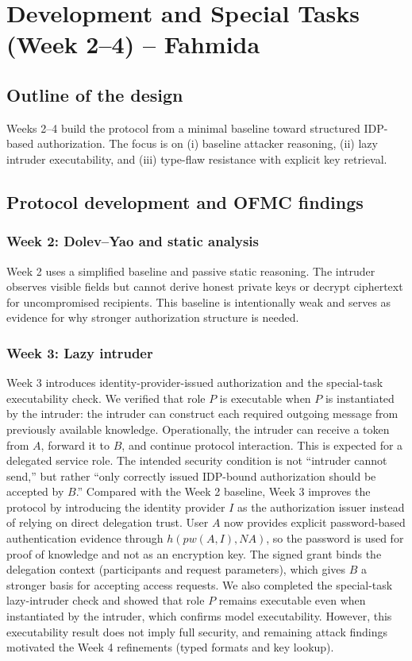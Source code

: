 \documentclass[11pt,a4paper]{article}
\begin{document}
\section{Development and Special Tasks (Week 2--4) -- Fahmida}
\subsection{Outline of the design}
Weeks 2--4 build the protocol from a minimal baseline toward structured IDP-based authorization.
The focus is on (i) baseline attacker reasoning, (ii) lazy intruder executability, and (iii) type-flaw resistance with explicit key retrieval.

\subsection{Protocol development and OFMC findings}
\subsubsection{Week 2: Dolev--Yao and static analysis}
Week 2 uses a simplified baseline and passive static reasoning.
The intruder observes visible fields but cannot derive honest private keys or decrypt ciphertext for uncompromised recipients.
This baseline is intentionally weak and serves as evidence for why stronger authorization structure is needed.

\subsubsection{Week 3: Lazy intruder}
Week 3 introduces identity-provider-issued authorization and the special-task executability check.
We verified that role $P$ is executable when $P$ is instantiated by the intruder:
the intruder can construct each required outgoing message from previously available knowledge.
Operationally, the intruder can receive a token from $A$, forward it to $B$, and continue protocol interaction.
This is expected for a delegated service role.
The intended security condition is not ``intruder cannot send,'' but rather ``only correctly issued IDP-bound authorization should be accepted by $B$.''
Compared with the Week 2 baseline, Week 3 improves the protocol by introducing the identity provider $I$ as the authorization issuer instead of relying on direct delegation trust.
User $A$ now provides explicit password-based authentication evidence through $h(pw(A,I),NA)$, so the password is used for proof of knowledge and not as an encryption key.
The signed grant binds the delegation context (participants and request parameters), which gives $B$ a stronger basis for accepting access requests.
We also completed the special-task lazy-intruder check and showed that role $P$ remains executable even when instantiated by the intruder, which confirms model executability.
However, this executability result does not imply full security, and remaining attack findings motivated the Week 4 refinements (typed formats and key lookup).
\end{document}

